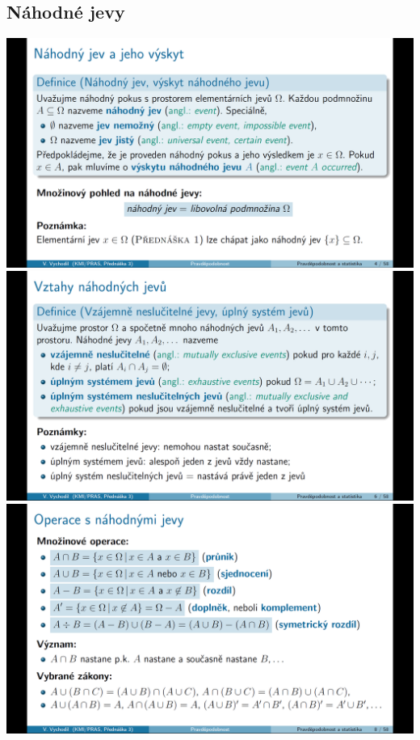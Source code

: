 \documentclass[12pt,a4paper]{article}
\begin{document}
\subsection{Náhodné jevy}
\begin{center}
	\includegraphics[scale=0.32]{img/nahodny_jev}
	\includegraphics[scale=0.32]{img/nahodny_jev_vztahy}
	\includegraphics[scale=0.32]{img/nahodny_jev_operace}
\end{center}
\newpage
\end{document}
